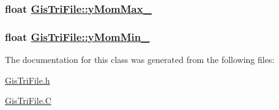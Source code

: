 \hypertarget{classGisTriFile_o8}{
\subsubsection[yMomMax\_\-]{\setlength{\rightskip}{0pt plus 5cm}float \hyperlink{classGisTriFile_o8}{Gis\-Tri\-File::y\-Mom\-Max\_\-}}}
\label{classGisTriFile_o8}


\hypertarget{classGisTriFile_o7}{
\subsubsection[yMomMin\_\-]{\setlength{\rightskip}{0pt plus 5cm}float \hyperlink{classGisTriFile_o7}{Gis\-Tri\-File::y\-Mom\-Min\_\-}}}
\label{classGisTriFile_o7}




The documentation for this class was generated from the following files:\begin{CompactItemize}
\item 
\hyperlink{GisTriFile_8h}{Gis\-Tri\-File.h}\item 
\hyperlink{GisTriFile_8C}{Gis\-Tri\-File.C}\end{CompactItemize}
